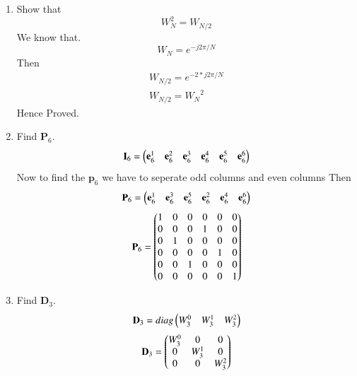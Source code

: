 \documentclass[journal,12pt,twocolumn]{IEEEtran}
\let\vec\mathbf
\renewcommand\thesection{\arabic{section}}
\begin{document}
\begin{enumerate}[label=\thesection.\arabic*]
\item Show that 
\begin{equation}
    W_{N}^{2}=W_{N/2}
	\label{eq:n-2}
\end{equation}
\solution We know that.
\begin{equation}
    W_{N} = e^{-j2\pi/N} 
\end{equation}
Then 
\begin{align}
    W_{N/2} = e^{-2*j2\pi/N} \\
    W_{N/2} = {W_{N}}^{2}
\end{align}
Hence Proved.
    \item Find $\vec{P}_6$. \\
    \solution 
	\begin{equation}
		\vec{I}_6 = \myvec{\vec{e}_6^{1} &\vec{e}_6^{2} &\vec{e}_6^{3} &\vec{e}_6^{4} &\vec{e}_6^{5} &\vec{e}_6^{6} }
	\end{equation}
	Now to find the $\vec{p}_6$ we have to seperate odd columns and even columns
	Then 
	\begin{equation}
		\vec{P}_6 = \myvec{\vec{e}_6^{1} &\vec{e}_6^{3} &\vec{e}_6^{5} &\vec{e}_6^{2} &\vec{e}_6^{4} &\vec{e}_6^{6} }
	\end{equation}
	\begin{equation}
		\vec{P}_6 =
		\myvec{
			1 & 0 & 0 & 0 & 0 & 0\\
			0 & 0 & 0 & 1 & 0 & 0\\
			0 & 1 & 0 & 0 & 0 & 0\\
			0 & 0 & 0 & 0 & 1 & 0\\
			0 & 0 & 1 & 0 & 0 & 0\\
			0 & 0 & 0 & 0 & 0 & 1\\
		}
	\end{equation}
    \item Find $\vec{D}_3$. \\
    \solution 
\begin{equation}
    \vec{D}_3 = diag\myvec{W_{3}^{0} & W_{3}^{1} & W_{3}^{2}}
\end{equation}
\begin{equation}
    \vec{D}_3 =
    \myvec{
        W^{0}_{3} & 0 & 0\\
        0 & W^{1}_{3} & 0\\
        0 & 0 & W^{2}_{3}\\
            }
\end{equation}

\end{enumerate}
\end{document}
